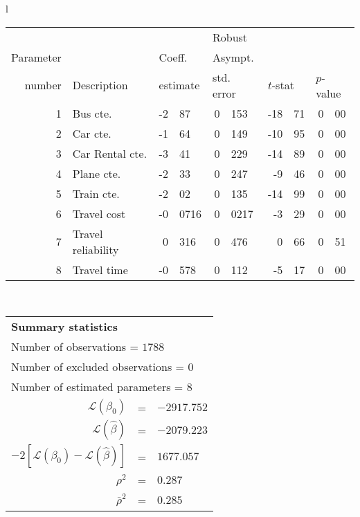   \begin{tabular}{l}
\begin{tabular}{rlr@{.}lr@{.}lr@{.}lr@{.}l}
         &                       &   \multicolumn{2}{l}{}    & \multicolumn{2}{l}{Robust}  &     \multicolumn{4}{l}{}   \\
Parameter &                       &   \multicolumn{2}{l}{Coeff.}      & \multicolumn{2}{l}{Asympt.}  &     \multicolumn{4}{l}{}   \\
number &  Description                     &   \multicolumn{2}{l}{estimate}      & \multicolumn{2}{l}{std. error}  &   \multicolumn{2}{l}{$t$-stat}  &   \multicolumn{2}{l}{$p$-value}   \\

\hline

1 & Bus cte. & -2&87 & 0&153 & -18&71 & 0&00\\
2 & Car cte. & -1&64 & 0&149 & -10&95 & 0&00\\
3 & Car Rental cte. & -3&41 & 0&229 & -14&89 & 0&00\\
4 & Plane cte. & -2&33 & 0&247 & -9&46 & 0&00\\
5 & Train cte. & -2&02 & 0&135 & -14&99 & 0&00\\
6 & Travel cost & -0&0716 & 0&0217 & -3&29 & 0&00\\
7 & Travel reliability & 0&316 & 0&476 & 0&66 & 0&51\\
8 & Travel time & -0&578 & 0&112 & -5&17 & 0&00\\
\hline
\end{tabular}
\\
\begin{tabular}{rcl}
\multicolumn{3}{l}{\bf Summary statistics}\\
\multicolumn{3}{l}{ Number of observations = $1788$} \\
\multicolumn{3}{l}{ Number of excluded observations = $0$} \\
\multicolumn{3}{l}{ Number of estimated  parameters = $8$} \\
 $\mathcal{L}(\beta_0)$ &=&  $-2917.752$ \\
 $\mathcal{L}(\hat{\beta})$ &=& $-2079.223 $  \\
 $-2[\mathcal{L}(\beta_0) -\mathcal{L}(\hat{\beta})]$ &=& $1677.057$ \\
    $\rho^2$ &=&   $0.287$ \\
    $\bar{\rho}^2$ &=&    $0.285$ \\
\end{tabular}
  \end{tabular}

